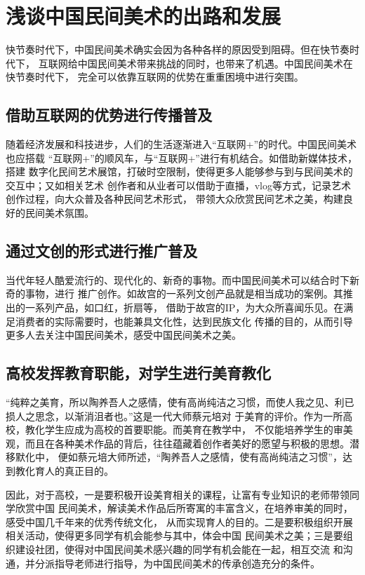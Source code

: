 \section{浅谈中国民间美术的出路和发展}
快节奏时代下，中国民间美术确实会因为各种各样的原因受到阻碍。但在快节奏时代下，
互联网给中国民间美术带来挑战的同时，也带来了机遇。中国民间美术在快节奏时代下，
完全可以依靠互联网的优势在重重困境中进行突围。
\subsection{借助互联网的优势进行传播普及}
随着经济发展和科技进步，人们的生活逐渐进入“互联网+”的时代。中国民间美术也应搭载
“互联网+”的顺风车，与“互联网+”进行有机结合。如借助新媒体技术，搭建
数字化民间艺术展馆，打破时空限制，使得更多人能够参与到与民间美术的交互中；又如相关艺术
创作者和从业者可以借助于直播，vlog等方式，记录艺术创作过程，向大众普及各种民间艺术形式，
带领大众欣赏民间艺术之美，构建良好的民间美术氛围。
\subsection{通过文创的形式进行推广普及}
当代年轻人酷爱流行的、现代化的、新奇的事物。而中国民间美术可以结合时下新奇的事物，进行
推广创作。如故宫的一系列文创产品就是相当成功的案例。其推出的一系列产品，如口红，折扇等，
借助于故宫的IP，为大众所喜闻乐见。在满足消费者的实际需要时，也能兼具文化性，达到民族文化
传播的目的，从而引导更多人去关注中国民间美术，感受中国民间美术之美。

\subsection{高校发挥教育职能，对学生进行美育教化}
“纯粹之美育，所以陶养吾人之感情，使有高尚纯洁之习惯，而使人我之见、利已损人之思念，以渐消沮者也。”这是一代大师蔡元培对
于美育的评价。作为一所高校，教化学生应成为高校的首要职能。而美育在教学中，
不仅能培养学生的审美观，而且在各种美术作品的背后，往往蕴藏着创作者美好的愿望与积极的思想。潜移默化中，
便如蔡元培大师所述，“陶养吾人之感情，使有高尚纯洁之习惯”，达到教化育人的真正目的。

因此，对于高校，一是要积极开设美育相关的课程，让富有专业知识的老师带领同学欣赏中国
民间美术，解读美术作品后所寄寓的丰富含义，在培养审美的同时，感受中国几千年来的优秀传统文化，
从而实现育人的目的。二是要积极组织开展相关活动，使得更多同学有机会能参与其中，体会中国
民间美术之美；三是要组织建设社团，使得对中国民间美术感兴趣的同学有机会能在一起，相互交流
和沟通，并分派指导老师进行指导，为中国民间美术的传承创造充分的条件。

